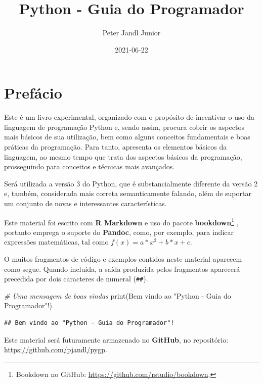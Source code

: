 \documentclass[
]{book}
\title{Python - Guia do Programador}
\author{Peter Jandl Junior}
\date{2021-06-22}
\newenvironment{Shaded}{\begin{snugshade}}{\end{snugshade}}
\newcommand{\BuiltInTok}[1]{#1}
\newcommand{\CommentTok}[1]{\textcolor[rgb]{0.56,0.35,0.01}{\textit{#1}}}
\newcommand{\NormalTok}[1]{#1}
\newcommand{\StringTok}[1]{\textcolor[rgb]{0.31,0.60,0.02}{#1}}
\begin{document}
\maketitle

{
\setcounter{tocdepth}{1}
\tableofcontents
}
\hypertarget{prefuxe1cio}{%
\chapter*{Prefácio}\label{prefuxe1cio}}

Este é um livro experimental, organizado com o propósito de incentivar o uso da linguagem de programação Python e, sendo assim, procura cobrir os aspectos mais básicos de sua utilização, bem como alguns conceitos fundamentais e boas práticas da programação. Para tanto, apresenta os elementos básicos da linguagem, ao mesmo tempo que trata dos aspectos básicos da programação, prosseguindo para conceitos e técnicas mais avançados.

Será utilizada a versão 3 do Python, que é substancialmente diferente da versão 2 e, também, considerada mais correta semanticamente falando, além de suportar um conjunto de novas e interessantes características.

Este material foi escrito com \textbf{R Markdown} e uso do pacote \textbf{bookdown}\footnote{Bookdown no GitHub: \url{https://github.com/rstudio/bookdown}.} \citep{R-bookdown, xie2015}, portanto emprega o suporte do \textbf{Pandoc}, como, por exemplo, para indicar expressões matemáticas, tal como \(f(x) = a*x^2 + b*x + c\).

O muitos fragmentos de código e exemplos contidos neste material aparecem como segue. Quando incluída, a saída produzida pelos fragmentos aparecerá precedida por dois caracteres de numeral (\texttt{\#\#}).

\begin{Shaded}
\begin{Highlighting}[]
\CommentTok{\# Uma mensagem de boas vindas}
\BuiltInTok{print}\NormalTok{(}\StringTok{\textquotesingle{}Bem vindo ao "Python {-} Guia do Programador"!\textquotesingle{}}\NormalTok{)}
\end{Highlighting}
\end{Shaded}

\begin{verbatim}
## Bem vindo ao "Python - Guia do Programador"!
\end{verbatim}

Este material será futuramente armazenado no \textbf{GitHub}, no repositório: \url{https://github.com/pjandl/pygp}.
\end{document}
